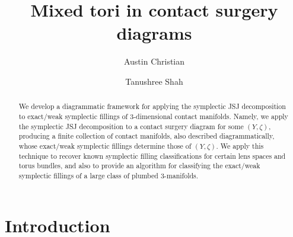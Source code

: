 \documentclass[11pt]{amsart}
\title[Mixed tori in contact surgery diagrams]{Mixed tori in contact surgery diagrams}
\author{Austin Christian} \email{achris66@calpoly.edu}\address{California Polytechnic State University, San Luis Obispo, CA}
\author{Tanushree Shah} \email{tanushrees@cmi.ac.in}\address{Chennai Mathematical Institute, India}
\numberwithin{equation}{section}
\theoremstyle{plain}
\theoremstyle{definition}
\theoremstyle{remark}\newtheorem{rem}[equation]{Remark}%
\theoremstyle{remark}\newtheorem{obs}[equation]{Observation}%
\begin{document}
\begin{abstract} 
We develop a diagrammatic framework for applying the symplectic JSJ decomposition to exact/weak symplectic fillings of 3-dimensional contact manifolds.  Namely, we apply the symplectic JSJ decomposition to a contact surgery diagram for some $(Y,\zeta)$, producing a finite collection of contact manifolds, also described diagrammatically, whose exact/weak symplectic fillings determine those of $(Y,\zeta)$.  We apply this technique to recover known symplectic filling classifications for certain lens spaces and torus bundles, and also to provide an algorithm for classifying the exact/weak symplectic fillings of a large class of plumbed 3-manifolds.
\end{abstract}


\maketitle
{
}


    


\section{Introduction}\label{sec:intro}
\end{document}
